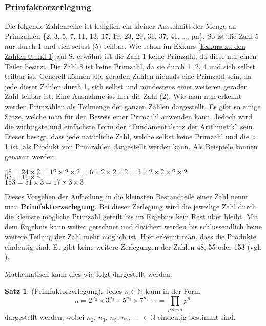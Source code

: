 \documentclass[12pt,a4paper]{article}
\theoremstyle{definition}
\newtheorem{satz}{Satz}[subsection]
\begin{document}
\subsubsection{Primfaktorzerlegung}\label{Primfaktorzerlegung}
Die folgende Zahlenreihe ist lediglich ein kleiner Ausschnitt der Menge an Primzahlen \{2, 3, 5, 7, 11, 13, 17, 19, 23, 29, 31, 37, 41, …, pn\}.
So ist die Zahl 5 nur durch 1 und sich selbst (5) teilbar.
Wie schon im Exkurs \ref{Exkurs zu den Zahlen 0 und 1} auf S. \pageref{Exkurs zu den Zahlen 0 und 1} erwähnt ist die Zahl 1 keine Primzahl, da diese nur einen Teiler besitzt.
Die Zahl 8 ist keine Primzahl, da sie durch 1, 2, 4 und sich selbst teilbar ist.
Generell können alle geraden Zahlen niemals eine Primzahl sein, da jede dieser Zahlen durch 1, sich selbst und mindestens einer weiteren geraden Zahl teilbar ist.
Eine Ausnahme ist hier die Zahl (2).
Wie man nun erkennt werden Primzahlen als Teilmenge der ganzen Zahlen dargestellt.
Es gibt so einige Sätze, welche man für den Beweis einer Primzahl anwenden kann.
Jedoch wird die wichtigste und einfachste Form der “Fundamentalsatz der Arithmetik” sein.
Dieser besagt, dass jede natürliche Zahl, welche selbst keine Primzahl und die > 1 ist, als Produkt von Primzahlen dargestellt werden kann.
Als Beispiele können genannt werden:\
\begin{center}$48 = 24\times{2} = 12\times{2}\times{2} = 6\times{2}\times{2}\times{2} = 3\times{2}\times{2}\times{2}\times{2}$\\
$55 = 11\times5$\\
$153 = 51\times{3} = 17\times{3}\times{3}$\end{center}
Dieses Vorgehen der Aufteilung in die kleinsten Bestandteile einer Zahl nennt man \textbf{Primfaktorzerlegung}.
Bei dieser Zerlegung wird die jeweilige Zahl durch die kleinste mögliche Primzahl geteilt bis im Ergebnis kein Rest über bleibt.
Mit dem Ergebnis kann weiter gerechnet und dividiert werden bis schlussendlich keine weitere Teilung der Zahl mehr möglich ist.
Hier erkennt man, dass die Produkte eindeutig sind.
Es gibt keine weitere Zerlegungen der Zahlen 48, 55 oder 153 (vgl. \cite{Hemmerich2020}).

Mathematisch kann dies wie folgt dargestellt werden:
\begin{satz}(Primfaktorzerlegung).\newline
Jedes $n \in \mathbb{N}$ kann in der Form
\[n = 2^{n_2} \times 3^{n_3} \times 5^{n_5} \times 7^{n_7} \cdot\cdot\cdot = \prod_{p\ prim} p^{n_p}\]
dargestellt werden, wobei $n_2$, $n_3$, $n_5$, $n_7$, ... $\in \mathbb{N}$ eindeutig bestimmt sind.
\end{satz}
\end{document}

